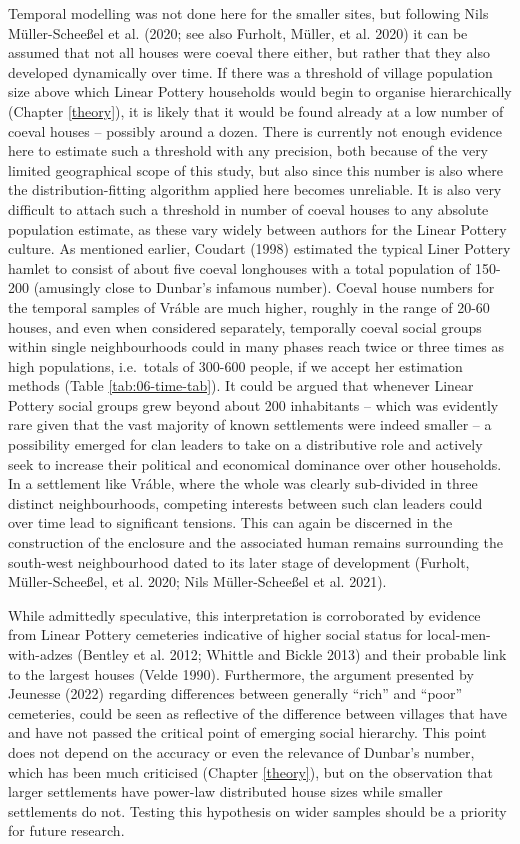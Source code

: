 \documentclass[
  12pt,
  a4paper, twoside]{book}
\begin{document}
Temporal modelling was not done here for the smaller sites, but following Nils Müller-Scheeßel et al. (2020; see also Furholt, Müller, et al. 2020) it can be assumed that not all houses were coeval there either, but rather that they also developed dynamically over time. If there was a threshold of village population size above which Linear Pottery households would begin to organise hierarchically (Chapter \ref{theory}), it is likely that it would be found already at a low number of coeval houses -- possibly around a dozen. There is currently not enough evidence here to estimate such a threshold with any precision, both because of the very limited geographical scope of this study, but also since this number is also where the distribution-fitting algorithm applied here becomes unreliable. It is also very difficult to attach such a threshold in number of coeval houses to any absolute population estimate, as these vary widely between authors for the Linear Pottery culture. As mentioned earlier, Coudart (1998) estimated the typical Liner Pottery hamlet to consist of about five coeval longhouses with a total population of 150-200 (amusingly close to Dunbar's infamous number). Coeval house numbers for the temporal samples of Vráble are much higher, roughly in the range of 20-60 houses, and even when considered separately, temporally coeval social groups within single neighbourhoods could in many phases reach twice or three times as high populations, i.e.~totals of 300-600 people, if we accept her estimation methods (Table \ref{tab:06-time-tab}). It could be argued that whenever Linear Pottery social groups grew beyond about 200 inhabitants -- which was evidently rare given that the vast majority of known settlements were indeed smaller -- a possibility emerged for clan leaders to take on a distributive role and actively seek to increase their political and economical dominance over other households. In a settlement like Vráble, where the whole was clearly sub-divided in three distinct neighbourhoods, competing interests between such clan leaders could over time lead to significant tensions. This can again be discerned in the construction of the enclosure and the associated human remains surrounding the south-west neighbourhood dated to its later stage of development (Furholt, Müller-Scheeßel, et al. 2020; Nils Müller-Scheeßel et al. 2021).

While admittedly speculative, this interpretation is corroborated by evidence from Linear Pottery cemeteries indicative of higher social status for local-men-with-adzes (Bentley et al. 2012; Whittle and Bickle 2013) and their probable link to the largest houses (Velde 1990). Furthermore, the argument presented by Jeunesse (2022) regarding differences between generally ``rich'' and ``poor'' cemeteries, could be seen as reflective of the difference between villages that have and have not passed the critical point of emerging social hierarchy. This point does not depend on the accuracy or even the relevance of Dunbar's number, which has been much criticised (Chapter \ref{theory}), but on the observation that larger settlements have power-law distributed house sizes while smaller settlements do not. Testing this hypothesis on wider samples should be a priority for future research.
\end{document}
